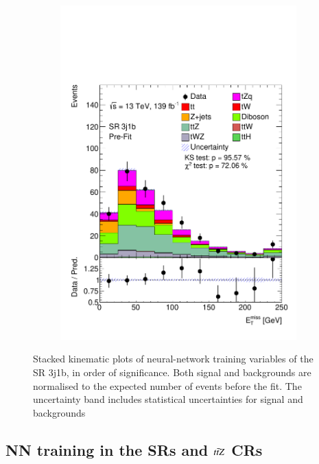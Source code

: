 \begin{figure}[!h]
\begin{subfigure}[b]{0.33\linewidth}
    \includegraphics[width=\linewidth]{ubonn-thesis/Chapters/Chapters_06/Figure/Input_distribution/SR_3j1b_MissEt.pdf} 
  \end{subfigure}
  \caption{Stacked kinematic plots of neural-network training variables of the SR 3j1b, in order of significance. Both signal and backgrounds are normalised to the expected number of events before the fit. The uncertainty band includes statistical uncertainties for signal and backgrounds}
  \label{fig_signal5}
  \end{figure}



\subsection{NN training in the SRs and $t\Bar{t}Z$ CRs}

